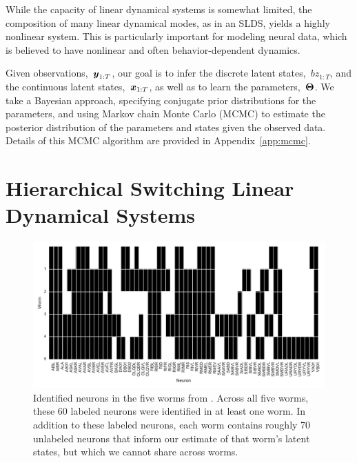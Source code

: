 \documentclass{article}
\begin{document}
While the capacity of linear dynamical systems is somewhat limited,
the composition of many linear dynamical modes, as in an SLDS, yields
a highly nonlinear system. This is particularly important for modeling
neural data, which is believed to have nonlinear and often behavior-dependent
dynamics.

Given observations,~$\boldsymbol{y}_{1:T}$, our goal is to infer the discrete
latent states,~$bz_{1:T}$, and the continuous latent states,~$\boldsymbol{x}_{1:T}$,
as well as to learn the parameters,~$\boldsymbol{\Theta}$.  We take a Bayesian
approach, specifying conjugate prior distributions for the parameters,
and using Markov chain Monte Carlo (MCMC) to estimate the posterior
distribution of the parameters and states given the observed data.
Details of this MCMC algorithm are provided in Appendix~\ref{app:mcmc}.



\section{Hierarchical Switching Linear Dynamical Systems}
\label{sec:hslds}

\begin{figure}[t]
\centering%
\includegraphics[width=5.5in]{identified_neurons.pdf} 
\caption{Identified neurons in the five worms from \citet{kato2015global}.
  Across all five worms, these 60 labeled neurons were identified in at
  least one worm. In addition to these labeled neurons,
  each worm contains roughly 70 unlabeled neurons that inform our
  estimate of that worm's latent states, but which we cannot share
  across worms. }
\label{fig:identified_neurons}
\end{figure}
\end{document}
